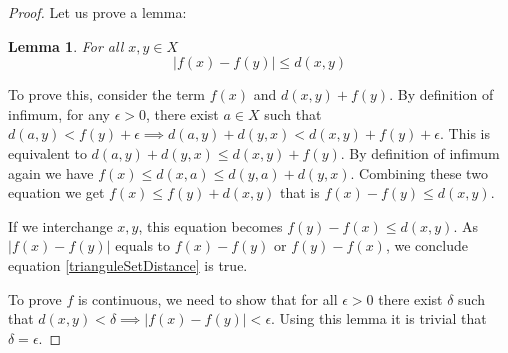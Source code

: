 \documentclass[12pt, a4paper]{article}
\newtheorem{lemma}[theorem]{Lemma}
\theoremstyle{definition}
\theoremstyle{remark}
\begin{document}
\begin{proof}

Let us prove a lemma:

\begin{lemma}
For all $x, y \in X$
\begin{equation}\label{trianguleSetDistance}
	|f(x) - f(y)| \leq d(x,y)
\end{equation}
\end{lemma}

To prove this, consider the term $f(x)$ and $d(x,y) + f(y)$. By definition of infimum, for any $\epsilon > 0$, there exist $a \in X$ such that $d(a,y) < f(y) + \epsilon \implies d(a,y) + d(y, x) < d(x, y) + f(y) + \epsilon $. This is equivalent to $d(a,y) + d(y,x) \leq d(x,y) + f(y)$.
By definition of infimum again we have $f(x) \leq d(x ,a) \leq d(y,a ) + d(y,x)$. Combining these two equation we get $f(x) \leq f(y) + d(x,y)$ that is $f(x) - f(y) \leq d(x,y)$. 

If we interchange $x, y$, this equation becomes $f(y) - f(x) \leq d(x,y)$. As $|f(x) - f(y)|$ equals to $f(x) - f(y)$ or $f(y) - f(x)$, we conclude equation \eqref{trianguleSetDistance} is true.

To prove $f$ is continuous, we need to show that for all $\epsilon > 0$ there exist $\delta$ such that $d(x,y) < \delta \implies |f(x) - f(y)| < \epsilon$. Using this lemma it is trivial that $\delta = \epsilon$.
\end{proof}
\end{document}
